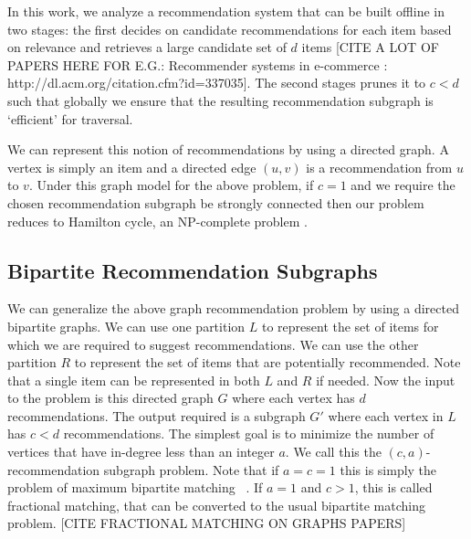 
In this work, we analyze a recommendation system that can be built
offline in two stages: the first decides on candidate recommendations
for each item based on relevance and retrieves a large candidate set
of $d$ items [CITE A LOT OF PAPERS HERE FOR E.G.: Recommender systems
  in e-commerce : http://dl.acm.org/citation.cfm?id=337035].  The
second stages prunes it to $c < d$ such that globally we ensure that
the resulting recommendation subgraph is `efficient' for traversal. 


We can represent this notion of recommendations by using a directed graph. A
vertex is simply an item and a directed edge $(u, v)$ is a recommendation from
$u$ to $v$. Under this graph model for the above problem, if $c=1$ and we
require the chosen recommendation subgraph be strongly connected then our
problem reduces to Hamilton cycle, an NP-complete problem \cite{CLRS2001}. \vs

\subsection{Bipartite Recommendation Subgraphs}

We can generalize the above graph recommendation problem by using a
directed bipartite graphs. We can use one partition $L$ to represent
the set of items for which we are required to suggest
recommendations. We can use the other partition $R$ to represent the
set of items that are potentially recommended. Note that a single item
can be represented in both $L$ and $R$ if needed.  Now the input to
the problem is this directed graph $G$ where each vertex has $d$
recommendations. The output required is a subgraph $G'$ where each
vertex in $L$ has $c < d$ recommendations. The simplest goal is to
minimize the number of vertices that have in-degree less than an
integer $a$. We call this the $(c, a)$-recommendation subgraph
problem.  Note that if $a=c=1$ this is simply the problem of maximum
bipartite matching ~\cite{LovaszPlummer1986}. If $a=1$ and $c > 1$,
this is called fractional matching, that can be converted to the
usual bipartite matching problem. [CITE FRACTIONAL MATCHING ON
  GRAPHS PAPERS]\vs

